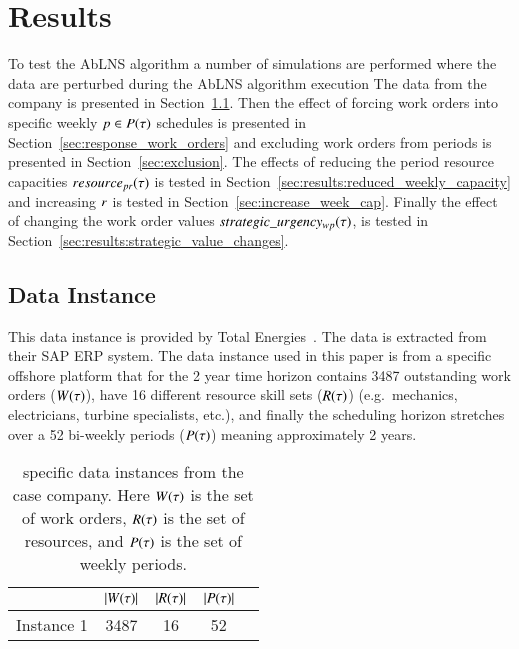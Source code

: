 \section{Results}\label{sec:3-results}
To test the AbLNS algorithm a number of simulations are performed where the
data are perturbed during the AbLNS algorithm execution The data from the
company is presented in Section~\ref{sec:data_instance}. Then the effect of
forcing work orders into specific weekly  $p \in P(\tau)$
schedules is presented in Section~\ref{sec:response_work_orders}  and excluding
work orders from periods is presented in Section~\ref{sec:exclusion}. The
effects of reducing the period resource capacities $\ParStrategicResource$ is
tested in Section~\ref{sec:results:reduced_weekly_capacity} and increasing $
r$ is tested in  Section~\ref{sec:increase_week_cap}.  Finally
the effect of changing the work order values $strategic\_urgency_{w p}(\tau)$,  is tested
in Section~\ref{sec:results:strategic_value_changes}.

\subsection{Data Instance}\label{sec:data_instance}
This data instance is provided by Total Energies~\citep{total-energies}. The data
is extracted from their SAP ERP system.  The data instance used in this paper
is from a specific offshore platform that for  the 2 year time horizon contains
3487 outstanding work orders ($W(\tau)$), have 16 different resource
skill sets ($R(\tau)$) (e.g.\ mechanics, electricians,  turbine specialists,
etc.), and finally the scheduling horizon stretches over a 52 bi-weekly periods
($P(\tau)$) meaning approximately 2 years.
 
\begin{table}[H]
\centering
\begin{tabular}{ccccc}
\toprule
           & $|W(\tau)|$ & $|R(\tau)|$ & $|P(\tau)|$ \\ \midrule
Instance 1 & 3487                & 16               & 52             \\ \bottomrule
\end{tabular}

\caption{specific data instances from the case company. Here $\SetWorkOrder$ is the set of work orders, $R(\tau)$ is the set of resources, and $P(\tau)$ is the set of weekly periods.} %
\end{table}

